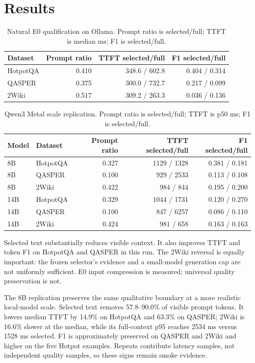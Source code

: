 \documentclass[10pt]{article}
\begin{document}
\section{Results}
\begin{table}[t]
\centering\small
\caption{Natural E0 qualification on Ollama. Prompt ratio is selected/full;
TTFT is median ms; F1 is selected/full.}
\begin{tabular}{lrrr}
\toprule Dataset & Prompt ratio & TTFT selected/full & F1 selected/full\\
\midrule
HotpotQA & 0.410 & 348.6 / 602.8 & 0.404 / 0.314\\
QASPER & 0.375 & 300.0 / 732.7 & 0.217 / 0.099\\
2Wiki & 0.517 & 309.2 / 263.3 & 0.036 / 0.136\\
\bottomrule
\end{tabular}
\label{tab:e0}
\end{table}

\begin{table}[t]
\centering\small
\caption{Qwen3 Metal scale replication. Prompt ratio is selected/full; TTFT is
p50 ms; F1 is selected/full.}
\begin{tabular}{llrrr}
\toprule Model & Dataset & Prompt ratio & TTFT selected/full & F1 selected/full\\
\midrule
8B & HotpotQA & 0.327 & 1129 / 1328 & 0.381 / 0.181\\
8B & QASPER & 0.100 & 929 / 2533 & 0.113 / 0.108\\
8B & 2Wiki & 0.422 & 984 / 844 & 0.195 / 0.200\\
14B & HotpotQA & 0.329 & 1044 / 1731 & 0.120 / 0.270\\
14B & QASPER & 0.100 & 847 / 6257 & 0.086 / 0.110\\
14B & 2Wiki & 0.424 & 981 / 658 & 0.163 / 0.163\\
\bottomrule
\end{tabular}
\label{tab:m5-8b}
\end{table}

Selected text substantially reduces visible context. It also improves TTFT and
token F1 on HotpotQA and QASPER in this run. The 2Wiki reversal is equally
important: the frozen selector's evidence and a small-model generation cap are
not uniformly sufficient. E0 input compression is measured; universal quality
preservation is not.

The 8B replication preserves the same qualitative boundary at a more realistic
local-model scale. Selected text removes 57.8--90.0\% of visible prompt tokens.
It lowers median TTFT by 14.9\% on HotpotQA and 63.3\% on QASPER; 2Wiki is
16.6\% slower at the median, while its full-context p95 reaches 2534 ms versus
1528 ms selected. F1 is approximately preserved on QASPER and 2Wiki and higher
on the five Hotpot examples. Repeats contribute latency samples, not independent
quality samples, so these signs remain smoke evidence.
\end{document}
